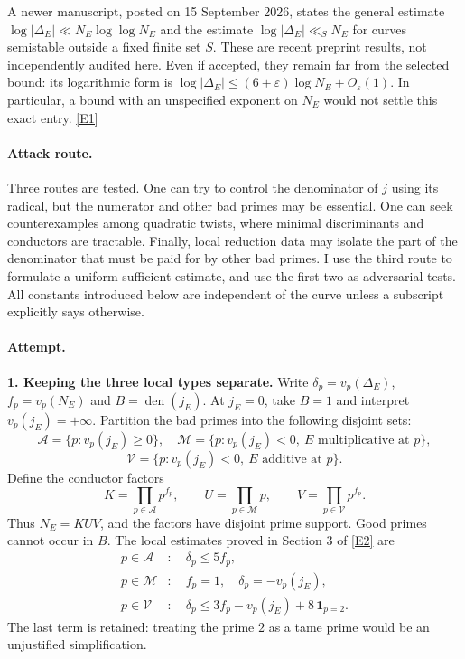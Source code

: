 \documentclass[11pt,a4paper]{article}
\newcommand{\eref}[2]{\hyperlink{extra:#1:#2}{[E#2]}}
\numberwithin{equation}{section}
\begin{document}
A newer manuscript, posted on 15 September 2026, states the general estimate
$\log|\Delta_E|\ll N_E\log\log N_E$ and the estimate
$\log|\Delta_E|\ll_S N_E$ for curves semistable outside a fixed finite set $S$.
These are recent preprint results, not independently audited here. Even if
accepted, they remain far from the selected bound: its logarithmic form is
$\log|\Delta_E|\leq(6+\varepsilon)\log N_E+O_\varepsilon(1)$.
In particular, a bound with an unspecified exponent on $N_E$ would not settle
this exact entry. \eref{105}{1}

\paragraph{Attack route.}
Three routes are tested. One can try to control the denominator of $j$ using
its radical, but the numerator and other bad primes may be essential. One
can seek counterexamples among quadratic twists, where minimal discriminants
and conductors are tractable. Finally, local reduction data may isolate the
part of the denominator that must be paid for by other bad primes. I use
the third route to formulate a uniform sufficient estimate, and use the
first two as adversarial tests. All constants introduced below are independent
of the curve unless a subscript explicitly says otherwise.

\paragraph{Attempt.}
\textbf{1. Keeping the three local types separate.}
Write $\delta_p=v_p(\Delta_E)$, $f_p=v_p(N_E)$ and
$B=\operatorname{den}(j_E)$. At $j_E=0$, take $B=1$ and interpret
$v_p(j_E)=+\infty$. Partition the bad primes into the following disjoint sets:
\[
 \mathcal A=\{p:v_p(j_E)\geq0\},\quad
 \mathcal M=\{p:v_p(j_E)<0,\ E\text{ multiplicative at }p\},
\]
\[
 \mathcal V=\{p:v_p(j_E)<0,\ E\text{ additive at }p\}.
\]
Define the conductor factors
\begin{equation}\label{105:factors}
 K=\prod_{p\in\mathcal A}p^{f_p},\qquad
 U=\prod_{p\in\mathcal M}p,\qquad
 V=\prod_{p\in\mathcal V}p^{f_p}.
\end{equation}
Thus $N_E=KUV$, and the factors have disjoint prime support. Good primes
cannot occur in $B$. The local estimates proved in Section 3 of
\eref{105}{2} are
\begin{align}
 p\in\mathcal A &: \quad\delta_p\leq5f_p,\nonumber\\
 p\in\mathcal M &: \quad f_p=1,\quad\delta_p=-v_p(j_E),\label{105:local}\\
 p\in\mathcal V &: \quad
 \delta_p\leq3f_p-v_p(j_E)+8\,\mathbf1_{p=2}.\nonumber
\end{align}
The last term is retained: treating the prime $2$ as a tame prime would be
an unjustified simplification.
\end{document}
